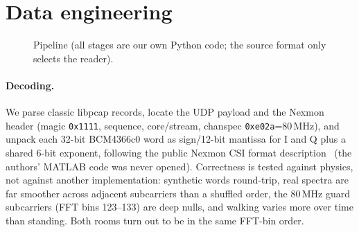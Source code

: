 \documentclass[11pt]{article}
\begin{document}
\section{Data engineering}
\begin{figure}[!htbp]
\centering\scriptsize
{}
\caption{Pipeline (all stages are our own Python code; the source format only selects the reader).}
\label{fig:pipe}
\end{figure}

\paragraph{Decoding.} We parse classic libpcap records, locate the UDP payload and the Nexmon header
(magic \texttt{0x1111}, sequence, core/stream, chanspec \texttt{0xe02a}=80\,MHz), and unpack each
32-bit BCM4366c0 word as sign/12-bit mantissa for I and Q plus a shared 6-bit exponent, following the
public Nexmon CSI format description~\cite{nexmon} (the authors' MATLAB code was never opened).
Correctness is tested against physics, not against another implementation: synthetic words round-trip,
real spectra are far smoother across adjacent subcarriers than a shuffled order, the 80\,MHz guard
subcarriers (FFT bins 123--133) are deep nulls, and walking varies more over time than standing. Both rooms
turn out to be in the same FFT-bin order.
\end{document}
